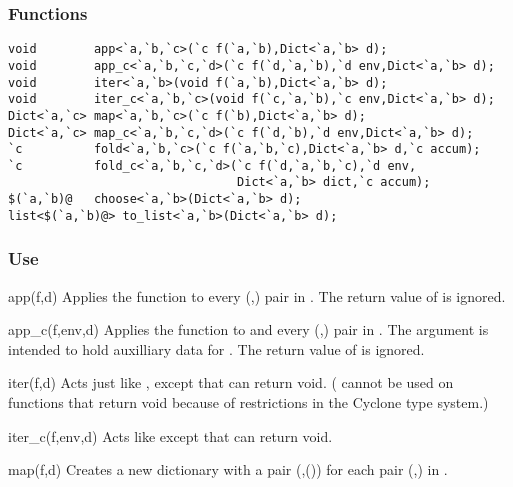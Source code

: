 \subsubsection*{Functions}
\begin{verbatim}
void        app<`a,`b,`c>(`c f(`a,`b),Dict<`a,`b> d);
void        app_c<`a,`b,`c,`d>(`c f(`d,`a,`b),`d env,Dict<`a,`b> d);
void        iter<`a,`b>(void f(`a,`b),Dict<`a,`b> d);
void        iter_c<`a,`b,`c>(void f(`c,`a,`b),`c env,Dict<`a,`b> d);
Dict<`a,`c> map<`a,`b,`c>(`c f(`b),Dict<`a,`b> d);
Dict<`a,`c> map_c<`a,`b,`c,`d>(`c f(`d,`b),`d env,Dict<`a,`b> d);
`c          fold<`a,`b,`c>(`c f(`a,`b,`c),Dict<`a,`b> d,`c accum);
`c          fold_c<`a,`b,`c,`d>(`c f(`d,`a,`b,`c),`d env,
                                Dict<`a,`b> dict,`c accum);
$(`a,`b)@   choose<`a,`b>(Dict<`a,`b> d);
list<$(`a,`b)@> to_list<`a,`b>(Dict<`a,`b> d);
\end{verbatim}

\subsubsection*{Use}

\begin{defun}{app}{(f,d)}
Applies the function  to every (,) pair in
.  The return value of  is ignored.
\end{defun}

\begin{defun}{app_c}{(f,env,d)}
Applies the function  to  and every
(,) pair in .  The argument  is
intended to hold auxilliary data for .  The return value of
 is ignored.
\end{defun}

\begin{defun}{iter}{(f,d)}
Acts just like , except that  can return void.
( cannot be used on functions that return void because of
restrictions in the Cyclone type system.)
\end{defun}

\begin{defun}{iter_c}{(f,env,d)}
Acts like  except that  can return void.
\end{defun}

\begin{defun}{map}{(f,d)}
Creates a new dictionary with a pair (,()) for
each pair (,) in .
\end{defun}

